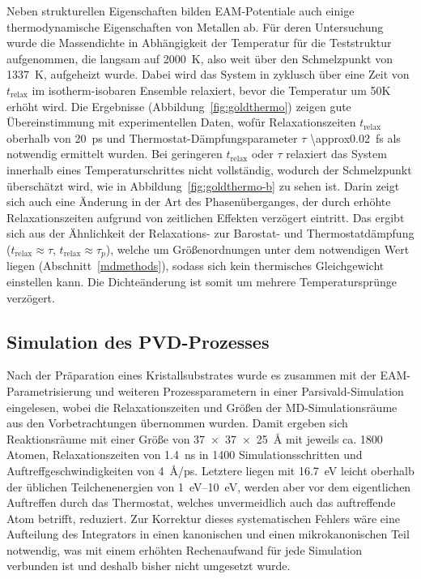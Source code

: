 Neben strukturellen Eigenschaften bilden EAM-Potentiale auch einige thermodynamische Eigenschaften von Metallen ab.
Für deren Untersuchung wurde die Massendichte in Abhängigkeit der Temperatur für die Teststruktur aufgenommen, die langsam auf \SI{2000}{\kelvin}, also weit über den Schmelzpunkt von \SI{1337}{\kelvin}, aufgeheizt wurde.
Dabei wird das System in zyklusch über eine Zeit von $t_\text{relax}$ im isotherm-isobaren Ensemble relaxiert, bevor die Temperatur um 50K erhöht wird.
Die Ergebnisse (Abbildung~\ref{fig:goldthermo}) zeigen gute Übereinstimmung mit experimentellen Daten, wofür Relaxationszeiten $t_\text{relax}$ oberhalb von \SI{20}{\pico\second} und Thermostat-Dämpfungsparameter $\tau$ \SI{\approx0.02}{\femto\second} als notwendig ermittelt wurden.
Bei geringeren $t_\text{relax}$ oder $\tau$ relaxiert das System innerhalb eines Temperaturschrittes nicht vollständig, wodurch der Schmelzpunkt überschätzt wird, wie in Abbildung~\ref{fig:goldthermo-b} zu sehen ist.
Darin zeigt sich auch eine Änderung in der Art des Phasenüberganges, der durch erhöhte Relaxationszeiten aufgrund von zeitlichen Effekten verzögert eintritt.
Das ergibt sich aus der Ähnlichkeit der Relaxations- zur Barostat- und Thermostatdämpfung ($t_\text{relax}\approx \tau$, $t_\text{relax}\approx \tau_p$), welche um Größenordnungen unter dem notwendigen Wert liegen (Abschnitt~\ref{mdmethods}), sodass sich kein thermisches Gleichgewicht einstellen kann.
Die Dichteänderung ist somit um mehrere Temperatursprünge verzögert.

\subsection{Simulation des PVD-Prozesses}

Nach der Präparation eines Kristallsubstrates wurde es zusammen mit der EAM-Parametrisierung und weiteren Prozessparametern in einer Parsivald-Simulation eingelesen, wobei die Relaxationszeiten und Größen der MD-Simulationsräume aus den Vorbetrachtungen übernommen wurden.
Damit ergeben sich Reaktionsräume mit einer Größe von \SI{37x37x25}{\angstrom} mit jeweils ca. \num{1800} Atomen, Relaxationszeiten von \SI{1.4}{\nano\second} in \num{1400} Simulationsschritten und Auftreffgeschwindigkeiten von \SI{4}{\angstrom/\pico\second}.
Letztere liegen mit \SI{16.7}{\electronvolt} leicht oberhalb der üblichen Teilchenenergien von \SIrange{1}{10}{\electronvolt}\cite{thompson_ii._1968}, werden aber vor dem eigentlichen Auftreffen durch das Thermostat, welches unvermeidlich auch das auftreffende Atom betrifft, reduziert.
Zur Korrektur dieses systematischen Fehlers wäre eine Aufteilung des Integrators in einen kanonischen und einen mikrokanonischen Teil notwendig, was mit einem erhöhten Rechenaufwand für jede Simulation verbunden ist und deshalb bisher nicht umgesetzt wurde.

